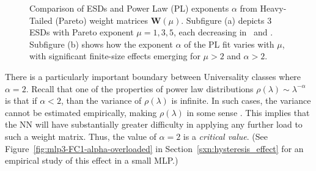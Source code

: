 \begin{figure}[h]
    \centering  
    \caption{Comparison of ESDs and Power Law (PL) exponents $\alpha$ from Heavy-Tailed (Pareto) 
weight matrices $\mathbf{W}(\mu)$. 
Subfigure (a) depicts 3 \Typical ESDs with Pareto exponent $\mu=1,3,5$, each decreasing in \SHAPE~and \SCALE.
Subfigure (b) shows how the exponent $\alpha$ of the PL fit varies with $\mu$, with significant finite-size
effects emerging for $\mu>2$ and $\alpha>2$.
}
   \label{fig:HT-esds}
\end{figure}

There is a particularly important boundary between Universality classes where $\alpha = 2$. Recall that one of the 
properties of power law distributions $\rho(\lambda)\sim \lambda^{-\alpha}$ is that if $\alpha<2$, than the variance of 
$\rho(\lambda)$ is infinite. In such cases, the variance cannot be estimated empirically, making $\rho(\lambda)$ in 
some sense \emph{\ATypical}. This implies that the NN will have substantially greater difficulty in applying any further 
load to such a weight matrix. Thus, the value of $\alpha = 2$ is a \emph{critical value}. (See 
Figure~\ref{fig:mlp3-FC1-alpha-overloaded} in Section~\ref{sxn:hysteresis_effect} for an empirical study of this effect 
in a small MLP.)

